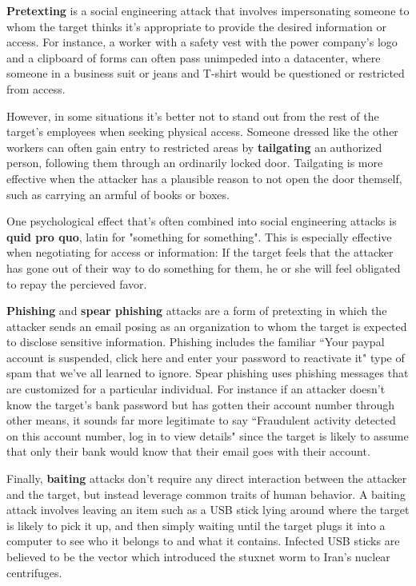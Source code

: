 \documentclass{report}
\begin{document}
{\bf Pretexting} is a social engineering attack that involves impersonating
someone to whom the target thinks it's appropriate to provide the desired
information or access. For instance, a worker with a safety vest with the
power company's logo and a clipboard of forms can often pass unimpeded into a
datacenter, where someone in a business suit or jeans and T-shirt would be
questioned or restricted from access. 

However, in some situations it's better not to stand out from the rest of the
target's employees when seeking physical access. Someone dressed like the other
workers can often gain entry to restricted areas by {\bf tailgating} an
authorized person, following them through an ordinarily locked door.
Tailgating is more effective when the attacker has a plausible reason to not
open the door themself, such as carrying an armful of books or boxes. 

One psychological effect that's often combined into social engineering attacks 
is {\bf quid pro quo}, latin for "something for something". This is especially
effective when negotiating for access or information: If the target feels that
the attacker has gone out of their way to do something for them, he or she
will feel obligated to repay the percieved favor. 

{\bf Phishing} and {\bf spear phishing} attacks are a form of pretexting in
which the attacker sends an email posing as an organization to whom the target
is expected to disclose sensitive information. Phishing includes the familiar
``Your paypal account is suspended, click here and enter your password to
reactivate it" type of spam that we've all learned to ignore. Spear phishing
uses phishing messages that are customized for a particular individual. For
instance if an attacker doesn't know the target's bank password but has gotten
their account number through other means, it sounds far more legitimate to say
``Fraudulent activity detected on this account number, log in to view details"
since the target is likely to assume that only their bank would know that
their email goes with their account. 

Finally, {\bf baiting} attacks don't require any direct interaction between
the attacker and the target, but instead leverage common traits of human
behavior. A baiting attack involves leaving an item such as a USB stick lying
around where the target is likely to pick it up, and then simply waiting until
the target plugs it into a computer to see who it belongs to and what it
contains. Infected USB sticks are believed to be the vector which introduced
the stuxnet worm to Iran's nuclear centrifuges. 
\end{document}
